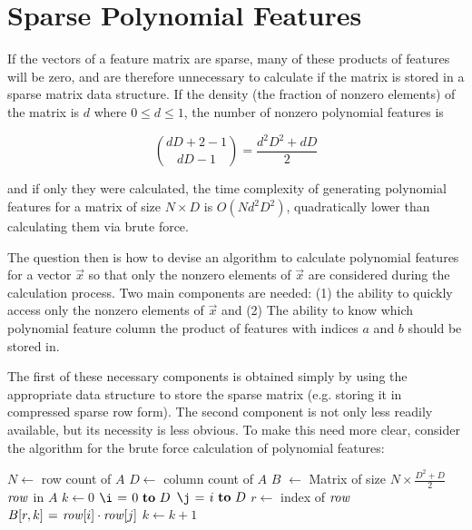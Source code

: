\documentclass[11pt,twocolumn]{article}
\begin{document}


\section{Sparse Polynomial Features} \label{sec:sparse}
If the vectors of a feature matrix are sparse, many of these products of features will be
zero, and are therefore unnecessary to calculate if the matrix is stored in a sparse matrix 
data structure. If the density (the fraction of nonzero elements) of the matrix is $d$ where $0 \le d \le 1$,
the number of nonzero polynomial features is

\begin{equation*}
\binom{dD+2-1}{dD-1} = \frac{d^2D^2+dD}{2}
\end{equation*}

and if only they were calculated, the time complexity of generating polynomial features
for a matrix of size $N \times D$ is $O(Nd^2D^2)$, quadratically lower than calculating them via brute force.

The question then is how to devise an algorithm to calculate polynomial features for a vector $\vec{x}$ so that
only the nonzero elements of $\vec{x}$ are considered during the calculation process. Two main components are needed: (1) the ability to
quickly access only the nonzero elements of $\vec{x}$ and (2) The ability to know which polynomial feature column
the product of features with indices $a$ and $b$ should be stored in.

The first of these necessary components is obtained simply by using the appropriate data structure
to store the sparse matrix (e.g. storing it in compressed sparse row form). The second component 
is not only less readily available, but its necessity is less obvious. To make this need more clear, consider the
algorithm for the brute force calculation of polynomial features:

\begin{codebox}
\footnotesize
{}
    \zi $N \gets$ row count of $A$
    \zi $D \gets$ column count of $A$
    \zi $B$ $\gets$ Matrix of size $N \times \frac{D^2+D}{2}$
    \zi \For $\id{row}$ in $A$ \Do
    \zi     $k \gets 0$
    \zi     \For $\i \gets 0 \To D$ \Do
    \zi         \For $\j \gets i \To D$ \Do
    \zi             $r \gets$ index of $\id{row}$
    \zi             $B[r, k] \gets \id{row}[i] \cdot \id{row}[j]$
    \zi             $k \gets k + 1$
                \End
            \End
       	\End
\end{codebox}
\end{document}
